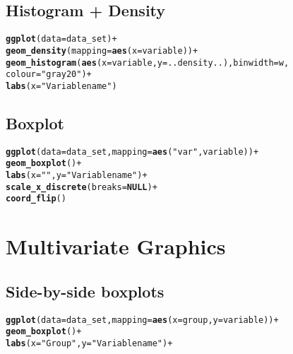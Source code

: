 \documentclass[10pt]{report}\usepackage[]{graphicx}\usepackage[]{color}
\makeatletter
\newcommand{\hlstr}[1]{\textcolor[rgb]{0.192,0.494,0.8}{#1}}%
\newcommand{\hlopt}[1]{\textcolor[rgb]{0,0,0}{#1}}%
\newcommand{\hlstd}[1]{\textcolor[rgb]{0.345,0.345,0.345}{#1}}%
\newcommand{\hlkwa}[1]{\textcolor[rgb]{0.161,0.373,0.58}{\textbf{#1}}}%
\newcommand{\hlkwc}[1]{\textcolor[rgb]{0.333,0.667,0.333}{#1}}%
\newcommand{\hlkwd}[1]{\textcolor[rgb]{0.737,0.353,0.396}{\textbf{#1}}}%
\newenvironment{kframe}{%
 \def\at@end@of@kframe{}%
 \ifinner\ifhmode%
  \def\at@end@of@kframe{\end{minipage}}%
  \begin{minipage}{\columnwidth}%
 \fi\fi%
 \def\FrameCommand##1{\hskip\@totalleftmargin \hskip-\fboxsep
 \colorbox{shadecolor}{##1}\hskip-\fboxsep
     \hskip-\linewidth \hskip-\@totalleftmargin \hskip\columnwidth}%
 \MakeFramed {\advance\hsize-\width
   \@totalleftmargin\z@ \linewidth\hsize
   \@setminipage}}%
 {\par\unskip\endMakeFramed%
 \at@end@of@kframe}
\newenvironment{knitrout}{}{} %
\makeatother
\begin{document}
\begin{multicols}{2}
\subsection*{Histogram + Density}
\begin{knitrout}\small
{}\color{fgcolor}\begin{kframe}
\begin{alltt}
\hlkwd{ggplot}\hlstd{(}\hlkwc{data} \hlstd{= data_set)} \hlopt{+}
  \hlkwd{geom_density}\hlstd{(}\hlkwc{mapping} \hlstd{=} \hlkwd{aes}\hlstd{(}\hlkwc{x} \hlstd{= variable))} \hlopt{+}
  \hlkwd{geom_histogram}\hlstd{(}\hlkwd{aes}\hlstd{(}\hlkwc{x} \hlstd{= variable,} \hlkwc{y} \hlstd{= ..density..),} \hlkwc{binwidth} \hlstd{= w,}
                 \hlkwc{colour} \hlstd{=} \hlstr{"gray20"}\hlstd{)} \hlopt{+}
  \hlkwd{labs}\hlstd{(}\hlkwc{x} \hlstd{=} \hlstr{"Variable name"}\hlstd{)}
\end{alltt}
\end{kframe}
\end{knitrout}
\squeeze
\subsection*{Boxplot}
\begin{knitrout}\small
{}\color{fgcolor}\begin{kframe}
\begin{alltt}
\hlkwd{ggplot}\hlstd{(}\hlkwc{data} \hlstd{= data_set,} \hlkwc{mapping} \hlstd{=} \hlkwd{aes}\hlstd{(}\hlstr{"var"}\hlstd{, variable))} \hlopt{+}
  \hlkwd{geom_boxplot}\hlstd{()} \hlopt{+}
  \hlkwd{labs}\hlstd{(}\hlkwc{x} \hlstd{=} \hlstr{""}\hlstd{,} \hlkwc{y} \hlstd{=} \hlstr{"Variable name"}\hlstd{)} \hlopt{+}
  \hlkwd{scale_x_discrete}\hlstd{(}\hlkwc{breaks} \hlstd{=} \hlkwa{NULL}\hlstd{)} \hlopt{+}
  \hlkwd{coord_flip}\hlstd{()}
\end{alltt}
\end{kframe}
\end{knitrout}

\columnbreak
\section*{Multivariate Graphics}
\subsection*{Side-by-side boxplots}
\begin{knitrout}\small
{}\color{fgcolor}\begin{kframe}
\begin{alltt}
\hlkwd{ggplot}(data = data_set, mapping = \hlkwd{aes}(x = group, y = variable)) +
  \hlkwd{geom_boxplot}() + 
  \hlkwd{labs}(x = \hlstr{"Group"}, y = \hlstr{"Variable name"}) +
\end{alltt}
\end{kframe}
\end{knitrout}
\squeeze

\end{multicols}
\end{document}

